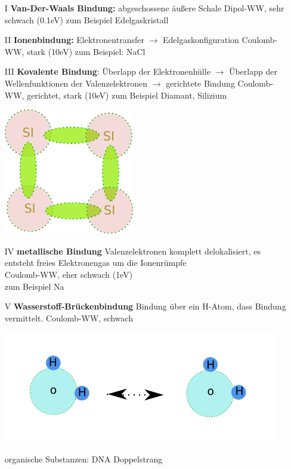 	\begin{itemize}
		\item[I] \textbf{Van-Der-Waals Bindung:}\newline
			abgeschossene äußere Schale \newline
			Dipol-WW, sehr schwach (0.1eV)\newline
			zum Beispiel Edelgaskristall
		\item[II] \textbf{Ionenbindung:} \newline
			Elektronentransfer $\rightarrow$ Edelgaskonfiguration \newline
			Coulomb-WW, stark (10eV) \newline
			zum Beispiel: NaCl
		\item[III] \textbf{Kovalente Bindung}:\newline
			Überlapp der Elektronenhülle $\rightarrow$  Überlapp der Wellenfunktionen der Valenzelektronen\newline
			$\rightarrow$ gerichtete Bindung \newline
			Coulomb-WW, gerichtet, stark (10eV)\newline
			zum Beispiel Diamant, Silizium
			\begin{center}
				\includegraphics{figures/1_1silizium.pdf}
			\end{center}
		\item[IV] \textbf{metallische Bindung}\newline
			Valenzelektronen komplett delokalisiert, es entsteht \glqq freies Elektronengas\grqq{}
			um die Ionenrümpfe \\
			Coulomb-WW, eher schwach (1eV)\\
			zum Beispiel Na
		\item[V] \textbf{Wasserstoff-Brückenbindung}\newline
			Bindung über ein H-Atom, dass Bindung vermittelt.\newline
			Coulomb-WW, schwach
			\begin{center}
				\includegraphics{figures/1_1wasserstoff.pdf}
			\end{center}
			organische Substanzen: DNA Doppelstrang
	\end{itemize}

